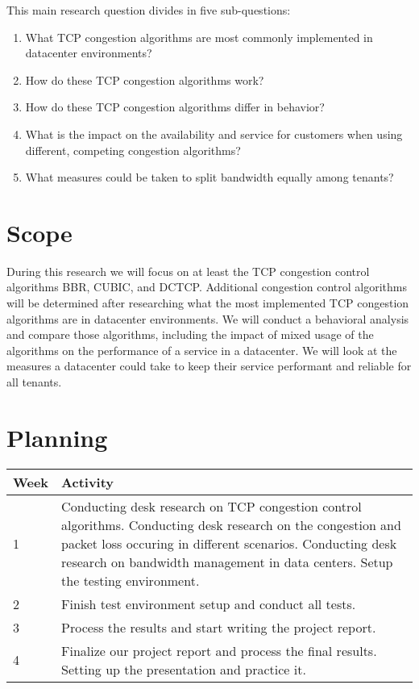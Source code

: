 \documentclass{article}
\begin{document}
\vspace{0.5cm}

This main research question divides in five sub-questions:

\begin{enumerate}
	\item What TCP congestion algorithms are most commonly implemented in datacenter environments?
	\item How do these TCP congestion algorithms work?
	\item How do these TCP congestion algorithms differ in behavior?
	\item What is the impact on the availability and service for customers when using different, competing congestion algorithms?
	\item What measures could be taken to split bandwidth equally among tenants?
\end{enumerate}


\section{Scope}

During this research we will focus on at least the TCP congestion control
algorithms BBR, CUBIC, and DCTCP. Additional congestion control algorithms will
be determined after researching what the most implemented TCP congestion
algorithms are in datacenter environments. We will conduct a behavioral
analysis and compare those algorithms, including the impact of mixed usage of
the algorithms on the performance of a service in a datacenter. We will look at
the measures a datacenter could take to keep their service performant and
reliable for all tenants.


\section{Planning}

\begin{tabular}[H]{ | l | p{10cm} | }
	\hline
	\textbf{Week} & \textbf{Activity} \\
	\hline 1 & Conducting desk research on TCP congestion control algorithms. Conducting desk research on the congestion and packet loss occuring in different scenarios. Conducting desk research on bandwidth management in data centers. Setup the testing environment. \\
	\hline 2 & Finish test environment setup and conduct all tests.\\
	\hline 3 & Process the results and start writing the project report. \\
	\hline 4 & Finalize our project report and process the final results. Setting up the presentation and practice it. \\
	\hline
\end{tabular}
\end{document}

